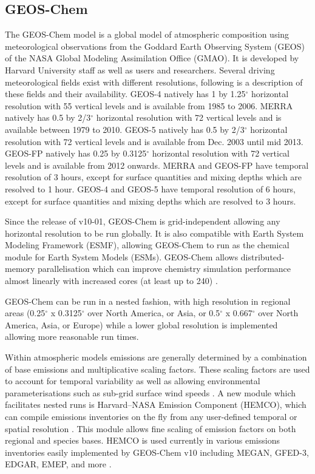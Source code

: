 \subsection{GEOS-Chem}

The GEOS-Chem model is a global model of atmospheric composition using meteorological observations from the Goddard Earth Observing System (GEOS) of the NASA Global Modeling Assimilation Office (GMAO). 
It is developed by Harvard University staff as well as users and researchers. 
Several driving meteorological fields exist with different resolutions, following is a description of these fields and their availability. 
GEOS-4 natively has 1 by 1.25$^\circ$ horizontal resolution with 55 vertical levels and is available from 1985 to 2006. 
MERRA natively has 0.5 by 2/3$^\circ$ horizontal resolution with 72 vertical levels and is available between 1979 to 2010.
GEOS-5 natively has 0.5 by 2/3$^\circ$ horizontal resolution with 72 vertical levels and is available from Dec. 2003 until mid 2013.
GEOS-FP natively has 0.25 by 0.3125$^\circ$ horizontal resolution with 72 vertical levels and is available from 2012 onwards.
MERRA and GEOS-FP have temporal resolution of 3 hours, except for surface quantities and mixing depths which are resolved to 1 hour.
GEOS-4 and GEOS-5 have temporal resolution of 6 hours, except for surface quantities and mixing depths which are resolved to 3 hours.

Since the release of v10-01, GEOS-Chem is grid-independent allowing any horizontal resolution to be run globally. 
It is also compatible with Earth System Modeling Framework (ESMF), allowing GEOS-Chem to run as the chemical module for Earth System Models (ESMs). 
GEOS-Chem allows distributed-memory parallelisation which can improve chemistry simulation performance almost linearly with increased cores (at least up to 240) \cite{Long_2015}.

GEOS-Chem can be run in a nested fashion, with high resolution in regional areas (0.25$^{\circ}$ x 0.3125$^{\circ}$ over North America, or Asia, or  0.5$^{\circ}$ x 0.667$^{\circ}$ over North America, Asia, or Europe) while a lower global resolution is implemented allowing more reasonable run times.

Within atmospheric models emissions are generally determined by a combination of base emissions and multiplicative scaling factors. 
These scaling factors are used to account for temporal variability as well as allowing environmental parameterisations such as sub-grid surface wind speeds \cite{Ridley_2013,Zender_2003}.
A new module which facilitates nested runs is Harvard–NASA Emission Component (HEMCO), which can compile emissions inventories on the fly from any user-defined temporal or spatial resolution \cite{Keller_2014}.
This module allows fine scaling of emission factors on both regional and species bases.
HEMCO is used currently in various emissions inventories easily implemented by GEOS-Chem v10 including MEGAN, GFED-3, EDGAR, EMEP, and more \cite{Keller_2014}.
  
  
  